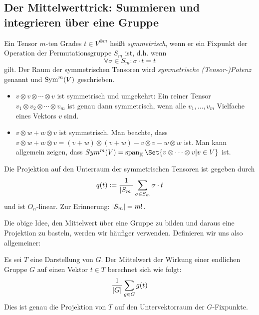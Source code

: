 \subsection{Der Mittelwerttrick: Summieren und integrieren über eine Gruppe}

\begin{definition}
	\label{symmetrische_tensoren:def}
Ein Tensor $m$-ten Grades $t\in V^{\otimes m}$ heißt \emph{symmetrisch}, wenn er ein Fixpunkt der Operation der Permutationsgruppe $S_m$ ist, d.h. wenn
\[\forall \sigma\in S_m: \sigma\cdot t = t\]
gilt. Der Raum der symmetrischen Tensoren wird \emph{symmetrische (Tensor-)Potenz} genannt und $\operatorname{Sym}^m(V)$ geschrieben.
\end{definition}

\begin{example}
\begin{itemize}
\item $v\otimes v\otimes \cdots\otimes v$ ist symmetrisch und umgekehrt: Ein reiner Tensor $v_1\otimes v_2\otimes\cdots\otimes v_m$ ist genau dann symmetrisch, wenn alle $v_1,\ldots, v_m$ Vielfache eines Vektors $v$ sind.
\item $v\otimes w + w\otimes v$ ist symmetrisch. Man beachte, dass $v\otimes w + w\otimes v = (v+w)\otimes(v+w) - v\otimes v - w\otimes w$ ist. Man kann allgemein zeigen, dass $Sym^m(V) = \operatorname{span}_\IK\Set{v\otimes\cdots\otimes v | v\in V}$ ist.
\end{itemize}
\end{example}

\begin{lemma}[Mittelwerttrick]\label{symmetrische_tensoren:projektion}
Die Projektion auf den Unterraum der symmetrischen Tensoren ist gegeben durch
\[q(t) := \frac{1}{\lvert S_m\rvert} \sum_{\sigma\in S_m} \sigma\cdot t\]
und ist $O_n$-linear. Zur Erinnerung: $\lvert S_m\rvert = m!$.
\end{lemma}
Die obige Idee, den Mittelwert über eine Gruppe zu bilden und daraus eine Projektion zu basteln, werden wir häufiger verwenden. Definieren wir uns also allgemeiner:
\begin{definition}
	Es sei $T$ eine Darstellung von $G$. Der Mittelwert der Wirkung einer endlichen Gruppe $G$ auf einen Vektor $t\in T$ berechnet sich wie folgt:
	\[
		\frac{1}{\lvert G\rvert} \sum_{g\in G} g(t)
	\]
	Dies ist genau die Projektion von $T$ auf den Untervektorraum der $G$-Fixpunkte.
\end{definition}

